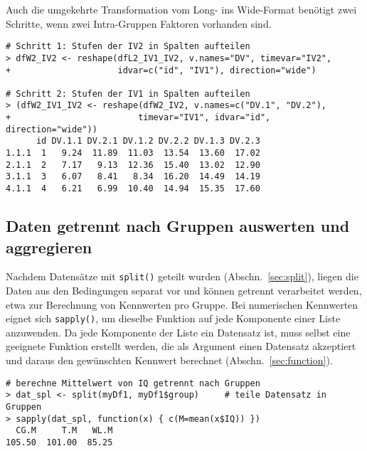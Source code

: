 Auch die umgekehrte Transformation vom Long- ins Wide-Format benötigt zwei Schritte, wenn zwei Intra-Gruppen Faktoren vorhanden sind.
\begin{lstlisting}
# Schritt 1: Stufen der IV2 in Spalten aufteilen
> dfW2_IV2 <- reshape(dfL2_IV1_IV2, v.names="DV", timevar="IV2",
+                     idvar=c("id", "IV1"), direction="wide")

# Schritt 2: Stufen der IV1 in Spalten aufteilen
> (dfW2_IV1_IV2 <- reshape(dfW2_IV2, v.names=c("DV.1", "DV.2"),
+                         timevar="IV1", idvar="id", direction="wide"))
      id DV.1.1 DV.2.1 DV.1.2 DV.2.2 DV.1.3 DV.2.3
1.1.1  1   9.24  11.89  11.03  13.54  13.60  17.02
2.1.1  2   7.17   9.13  12.36  15.40  13.02  12.90
3.1.1  3   6.07   8.41   8.34  16.20  14.49  14.19
4.1.1  4   6.21   6.99  10.40  14.94  15.35  17.60
\end{lstlisting}

\subsection{Daten getrennt nach Gruppen auswerten und aggregieren}
\label{sec:aggregate}

Nachdem Datensätze mit \lstinline!split()! geteilt wurden (Abschn.\ \ref{sec:split}), liegen die Daten aus den Bedingungen separat vor und können getrennt verarbeitet werden, etwa zur Berechnung von Kennwerten pro Gruppe. Bei numerischen Kennwerten eignet sich \lstinline!sapply()!, um dieselbe Funktion auf jede Komponente einer Liste anzuwenden. Da jede Komponente der Liste ein Datensatz ist, muss selbst eine geeignete Funktion erstellt werden, die als Argument einen Datensatz akzeptiert und daraus den gewünschten Kennwert berechnet (Abschn.\ \ref{sec:function}).
\begin{lstlisting}
# berechne Mittelwert von IQ getrennt nach Gruppen
> dat_spl <- split(myDf1, myDf1$group)     # teile Datensatz in Gruppen
> sapply(dat_spl, function(x) { c(M=mean(x$IQ)) })
  CG.M     T.M   WL.M
105.50  101.00  85.25
\end{lstlisting}

